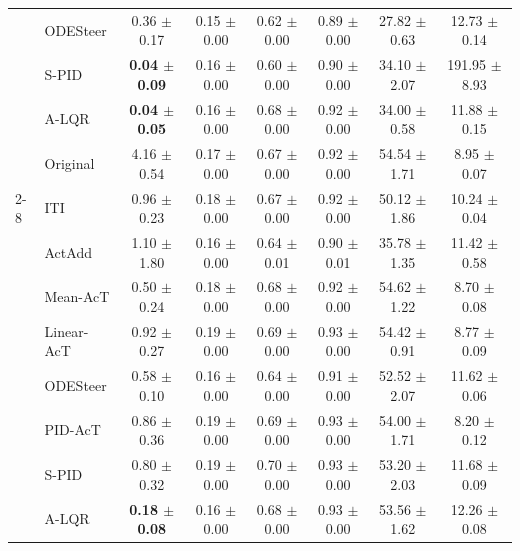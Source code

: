 \documentclass{article}
\theoremstyle{plain}
\theoremstyle{definition}
\theoremstyle{remark}
\begin{document}
\begin{table}[H]
\begin{threeparttable}
\begin{tabular}{ll|>{\columncolor{lightblue}}c|ccc|c|c}
    & ODESteer &  0.36 {\tiny $\pm$0.17} & 0.15 {\tiny $\pm$0.00} & 0.62 {\tiny $\pm$0.00} & 0.89 {\tiny $\pm$0.00}& 27.82 {\tiny $\pm$0.63} & 12.73 {\tiny $\pm$0.14} \\
    & S-PID &  \textbf{0.04 {\tiny $\pm$0.09}} & 0.16 {\tiny $\pm$0.00} & 0.60 {\tiny $\pm$0.00} & 0.90 {\tiny $\pm$0.00} &  34.10 {\tiny $\pm$2.07} & 191.95 {\tiny $\pm$8.93} \\
    & A-LQR &  \textbf{0.04 {\tiny $\pm$0.05}} & 0.16 {\tiny $\pm$0.00} & 0.68 {\tiny $\pm$0.00} & 0.92 {\tiny $\pm$0.00} & 34.00 {\tiny $\pm$0.58} & 11.88 {\tiny $\pm$0.15} \\
    \midrule
    
    & Original &  4.16 {\tiny $\pm$0.54} & 0.17 {\tiny $\pm$0.00} & 0.67 {\tiny $\pm$0.00} & 0.92 {\tiny $\pm$0.00} & 54.54 {\tiny $\pm$1.71} & 8.95 {\tiny $\pm$0.07} \\
    \cmidrule(lr){2-8}
    \multirow{8}{*}{\rotatebox{90}{Gemma-2-2B}} 
    & ITI & 0.96 {\tiny $\pm$0.23} & 0.18 {\tiny $\pm$0.00} & 0.67 {\tiny $\pm$0.00} & 0.92 {\tiny $\pm$0.00} & 50.12 {\tiny $\pm$1.86} & 10.24 {\tiny $\pm$0.04} \\
    & ActAdd & 1.10 {\tiny $\pm$1.80} & 0.16 {\tiny $\pm$0.00} & 0.64 {\tiny $\pm$0.01} & 0.90 {\tiny $\pm$0.01} & 35.78 {\tiny $\pm$1.35} & 11.42 {\tiny $\pm$0.58} \\
    & Mean-AcT & 0.50 {\tiny $\pm$0.24} & 0.18 {\tiny $\pm$0.00} & 0.68 {\tiny $\pm$0.00} & 0.92 {\tiny $\pm$0.00} & 54.62 {\tiny $\pm$1.22} & 8.70 {\tiny $\pm$0.08} \\
    & Linear-AcT & 0.92 {\tiny $\pm$0.27} &  0.19 {\tiny $\pm$0.00} & 0.69 {\tiny $\pm$0.00} & 0.93 {\tiny $\pm$0.00} & 54.42 {\tiny $\pm$0.91} & 8.77 {\tiny $\pm$0.09} \\
    & ODESteer &  0.58 {\tiny $\pm$0.10} & 0.16 {\tiny $\pm$0.00} & 0.64 {\tiny $\pm$0.00} & 0.91 {\tiny $\pm$0.00} & 52.52 {\tiny $\pm$2.07} & 11.62 {\tiny $\pm$0.06} \\
    & PID-AcT & 0.86 {\tiny $\pm$0.36} & 0.19 {\tiny $\pm$0.00} & 0.69 {\tiny $\pm$0.00} & 0.93 {\tiny $\pm$0.00} & 54.00 {\tiny $\pm$1.71} & 8.20 {\tiny $\pm$0.12} \\
    & S-PID &  0.80 {\tiny $\pm$0.32} & 0.19 {\tiny $\pm$0.00} & 0.70 {\tiny $\pm$0.00} & 0.93 {\tiny $\pm$0.00} & 53.20 {\tiny $\pm$2.03} & 11.68 {\tiny $\pm$0.09} \\
    & A-LQR &  \textbf{0.18 {\tiny $\pm$0.08}} & 0.16 {\tiny $\pm$0.00} & 0.68 {\tiny $\pm$0.00} & 0.93 {\tiny $\pm$0.00} & 53.56 {\tiny $\pm$1.62} & 12.26 {\tiny $\pm$0.08} \\
    

\end{tabular}
\end{threeparttable}
\end{table}
\end{document}
